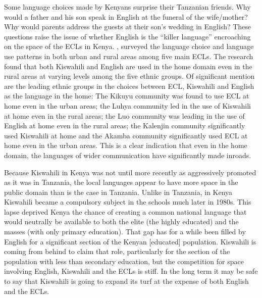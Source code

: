 \documentclass[output=paper,colorlinks,citecolor=brown]{langscibook}
\begin{document}
Some language choices made by Kenyans surprise their Tanzanian friends. Why would a father and his son speak in English at the funeral of the wife\slash mother? Why would parents address the guests at their son’s wedding in English? These questions raise the issue of whether English is the “killer language” encroaching on the space of the ECLs in Kenya.  \citet{MuthwiiKioko2002}, surveyed the language choice and language use patterns in both urban and rural areas among five main ECLs.  The research found that both Kiswahili and English are used in the home domain even in the rural areas at varying levels among the five ethnic groups.  Of significant mention are the leading ethnic groups in the choices between ECL, Kiswahili and English as the language in the home: The Kikuyu community was found to use ECL at home even in the urban areas; the Luhya community led in the use of Kiswahili at home even in the rural areas; the Luo community was leading in the use of English at home even in the rural areas; the Kalenjin community significantly used Kiswahili at home and the Akamba community significantly used ECL at home even in the urban areas.   This is a clear indication that even in the home domain, the languages of wider communication have significantly made inroads.

\begin{sloppypar}
Because Kiswahili in Kenya was not until more recently as aggressively promoted as it was in Tanzania, the local languages appear to have more space in the public domain than is the case in Tanzania. Unlike in Tanzania, in Kenya Kiswahili became a compulsory subject in the schools much later in 1980s. This lapse deprived Kenya the chance of creating a common national language that would neutrally be available to both the elite (the highly educated) and the masses (with only primary education).  That gap has for a while been filled by English for a significant section of the Kenyan [educated] population.  Kiswahili is coming from behind to claim that role, particularly for the section of the population with less than secondary education, but the competition for space involving English, Kiswahili and the ECLs is stiff. In the long term it may be safe to say that Kiswahili is going to expand its turf at the expense of both English and the ECLs.  
\end{sloppypar}
\end{document}
